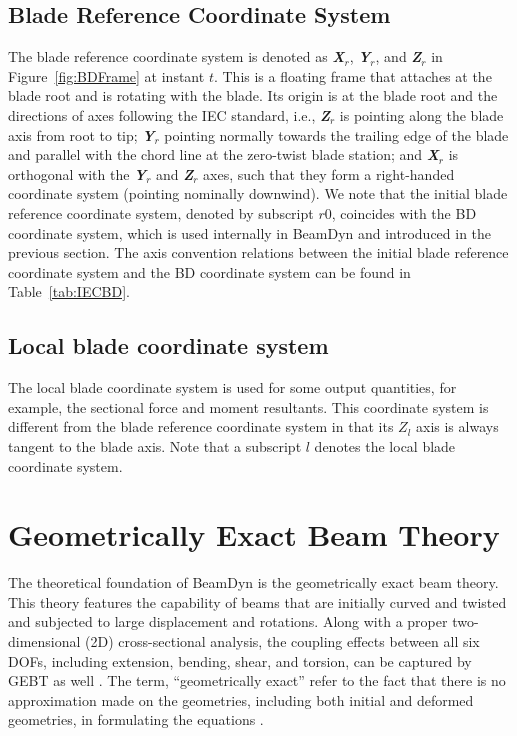 \subsection{Blade Reference Coordinate System}
The blade reference coordinate system is denoted as \textbf{ {\it X$_r$}}, \textbf{ {\it Y$_r$}}, and \textbf{ {\it Z$_r$}} in Figure~\ref{fig:BDFrame} at instant $t$. 
This is a floating frame that attaches at the blade root and is rotating with the blade. 
Its origin is at the blade root and the directions of axes following the IEC standard, i.e., \textbf{ {\it Z$_r$}} is pointing along the blade axis from root to tip; \textbf{ {\it Y$_r$}} pointing normally towards the trailing edge of the blade and parallel with the chord line at the zero-twist blade station; and \textbf{ {\it X$_r$}} is orthogonal with the \textbf{ {\it Y$_r$}} and \textbf{ {\it Z$_r$}} axes, such that they form a right-handed coordinate system (pointing nominally downwind). 
We note that the initial blade reference coordinate system, denoted by subscript $r0$, coincides with the BD coordinate system, which is used internally in BeamDyn and introduced in the previous section. 
The axis convention relations between the initial blade reference coordinate system and the BD coordinate system can be found in Table~\ref{tab:IECBD}. 

\subsection{Local blade coordinate system}
The local blade coordinate system is used for some output quantities, for example, the sectional force and moment resultants. This coordinate system is different from the blade reference coordinate system in that its $Z_l$ axis is always tangent to the blade axis. Note that a subscript $l$ denotes the local blade coordinate system.

\section{Geometrically Exact Beam Theory}
The theoretical foundation of BeamDyn is the geometrically exact beam theory. 
This theory features the capability of beams that are initially curved and twisted and subjected to large displacement and rotations. 
Along with a proper two-dimensional (2D) cross-sectional analysis, the coupling effects between all six DOFs, including extension, bending, shear, and torsion, can be captured by GEBT as well . 
The term, ``geometrically exact'' refer to the fact that there is no approximation made on the geometries, including both initial and deformed geometries, in formulating the equations \cite{HodgesBeamBook}.    

